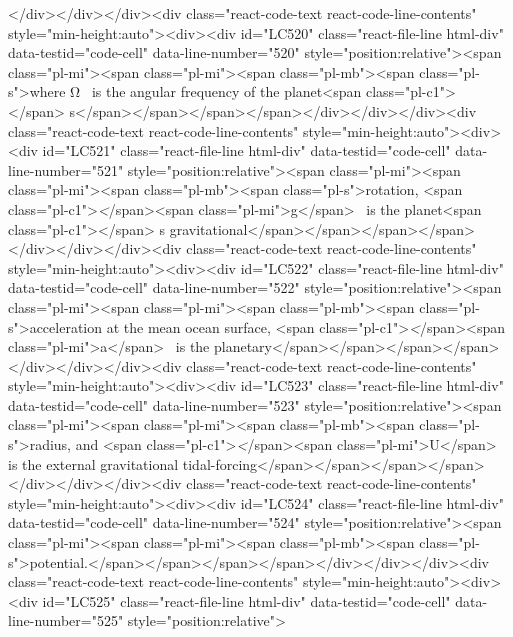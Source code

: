 {{{{{{{{</div></div></div><div class="react-code-text react-code-line-contents" style="min-height:auto"><div><div id="LC520" class="react-file-line html-div" data-testid="code-cell" data-line-number="520" style="position:relative"><span class="pl-mi"><span class="pl-mi"><span class="pl-mb"><span class="pl-s">where Ω~ is the angular frequency of the planet<span class="pl-c1">\textquotesingle</span> s</span></span></span></span></div></div></div><div class="react-code-text react-code-line-contents" style="min-height:auto"><div><div id="LC521" class="react-file-line html-div" data-testid="code-cell" data-line-number="521" style="position:relative"><span class="pl-mi"><span class="pl-mi"><span class="pl-mb"><span class="pl-s">rotation, <span class="pl-c1">\emph</span>{<span class="pl-mi">g</span>}~ is the planet<span class="pl-c1">\textquotesingle</span> s gravitational</span></span></span></span></div></div></div><div class="react-code-text react-code-line-contents" style="min-height:auto"><div><div id="LC522" class="react-file-line html-div" data-testid="code-cell" data-line-number="522" style="position:relative"><span class="pl-mi"><span class="pl-mi"><span class="pl-mb"><span class="pl-s">acceleration at the mean ocean surface, <span class="pl-c1">\emph</span>{<span class="pl-mi">a</span>}~ is the planetary</span></span></span></span></div></div></div><div class="react-code-text react-code-line-contents" style="min-height:auto"><div><div id="LC523" class="react-file-line html-div" data-testid="code-cell" data-line-number="523" style="position:relative"><span class="pl-mi"><span class="pl-mi"><span class="pl-mb"><span class="pl-s">radius, and <span class="pl-c1">\emph</span>{<span class="pl-mi">U</span>}~ is the external gravitational tidal-forcing</span></span></span></span></div></div></div><div class="react-code-text react-code-line-contents" style="min-height:auto"><div><div id="LC524" class="react-file-line html-div" data-testid="code-cell" data-line-number="524" style="position:relative"><span class="pl-mi"><span class="pl-mi"><span class="pl-mb"><span class="pl-s">potential.</span></span></span></span></div></div></div><div class="react-code-text react-code-line-contents" style="min-height:auto"><div><div id="LC525" class="react-file-line html-div" data-testid="code-cell" data-line-number="525" style="position:relative">
}}}}}}}}
